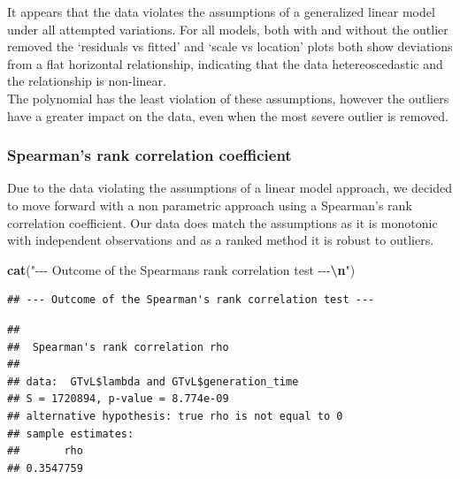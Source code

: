 \documentclass[
]{article}
\newenvironment{Shaded}{\begin{snugshade}}{\end{snugshade}}
\newcommand{\AttributeTok}[1]{\textcolor[rgb]{0.13,0.29,0.53}{#1}}
\newcommand{\FunctionTok}[1]{\textcolor[rgb]{0.13,0.29,0.53}{\textbf{#1}}}
\newcommand{\NormalTok}[1]{#1}
\newcommand{\SpecialCharTok}[1]{\textcolor[rgb]{0.81,0.36,0.00}{\textbf{#1}}}
\newcommand{\StringTok}[1]{\textcolor[rgb]{0.31,0.60,0.02}{#1}}
\begin{document}
It appears that the data violates the assumptions of a generalized
linear model under all attempted variations. For all models, both with
and without the outlier removed the `residuals vs fitted' and `scale vs
location' plots both show deviations from a flat horizontal
relationship, indicating that the data hetereoscedastic and the
relationship is non-linear.\\
The polynomial has the least violation of these assumptions, however the
outliers have a greater impact on the data, even when the most severe
outlier is removed.

\subsubsection{Spearman's rank correlation
coefficient}\label{spearmans-rank-correlation-coefficient}

Due to the data violating the assumptions of a linear model approach, we
decided to move forward with a non parametric approach using a
Spearman's rank correlation coefficient. Our data does match the
assumptions as it is monotonic with independent observations and as a
ranked method it is robust to outliers.

\begin{Shaded}
\begin{Highlighting}[]
\FunctionTok{cat}\NormalTok{(}\StringTok{"{-}{-}{-} Outcome of the Spearman\textquotesingle{}s rank correlation test {-}{-}{-}}\SpecialCharTok{\textbackslash{}n}\StringTok{"}\NormalTok{)}
\end{Highlighting}
\end{Shaded}

\begin{verbatim}
## --- Outcome of the Spearman's rank correlation test ---
\end{verbatim}

\begin{Shaded}
\end{Shaded}

\begin{verbatim}
## 
##  Spearman's rank correlation rho
## 
## data:  GTvL$lambda and GTvL$generation_time
## S = 1720894, p-value = 8.774e-09
## alternative hypothesis: true rho is not equal to 0
## sample estimates:
##       rho 
## 0.3547759
\end{verbatim}
\end{document}
